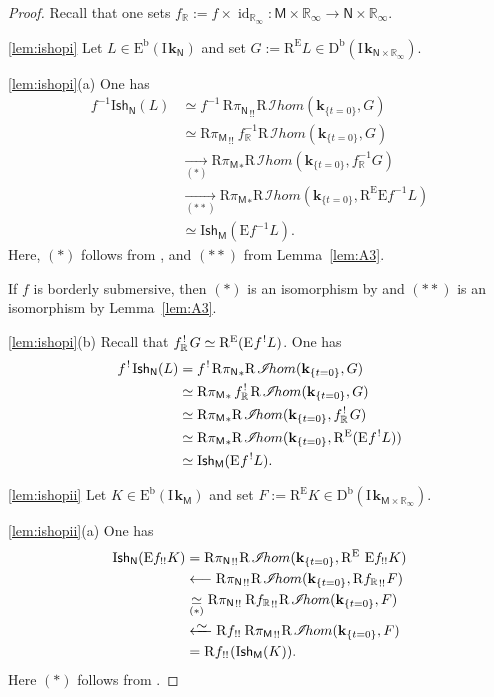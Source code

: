 \documentclass[11pt]{article}
\numberwithin{equation}{section}
\let\mathcal\mathscr
\newcommand\from{\mathchoice{\longleftarrow}{\leftarrow}{\leftarrow}{\leftarrow}}
\newcommand{\isofrom}[1][]{\xleftarrow[#1]%
{\raisebox{-.4ex}[0ex][-.4ex]{$\mspace{2mu}\sim\mspace{2mu}$}}}
\theoremstyle{plain}
\theoremstyle{definition}
\newcommand{\R}{\mathbb{R}}
\newcommand{\bR}{{\R_\infty}}
\newcommand{\derived}[1]{\mathrm{#1}}
\newcommand{\derd}{\derived{D}}
\newcommand{\dere}{\derived{E}}\let\enh\dere
\newcommand{\derr}{\derived{R}}
\newcommand{\BDC}{\derd^{\mathrm{b}}}
\newcommand{\BEC}[2][\ifield]{\dere^{\mathrm{b}}(#1_{#2})}
\newcommand{\roim}[1]{\derr#1_*}
\newcommand{\reeim}[1]{\derr#1_{\mspace{1mu}!!}\mspace{1mu}}
\newcommand{\rihom}{{\derr\mspace{2mu}\shi\!hom}}
\newcommand{\epb}[1]{#1^{\mspace{1.5mu}!}\mspace{2mu}}
\newcommand{\sheaffont}[1]{\mathcal{#1}}
\newcommand\shi{\sheaffont{I}}
\newcommand{\RE}{\operatorname{R^\enh}}
\newcommand{\Eopb}[1]{\enh#1^{-1}}
\newcommand{\Eeeim}[1]{\enh#1_{!!}}
\newcommand{\Eepb}[1]{\enh\mspace{1mu}#1^{\mspace{1.5mu}!}}
\DeclareMathOperator{\id}{id}
\newcommand{\field}{\mathbf{k}}\let\cor\field
\newcommand{\ind}{\mathrm{I}\mspace{2mu}}
\newcommand{\ifield}{\ind\field}
\newcommand{\Ish}{\mathrm{I}\mathsf{sh}}
\newcommand{\bbM}{\mathsf{M}}
\newcommand{\bbN}{\mathsf{N}}
\newcommand{\defeq}{\mathbin{:=}}\let \seteq\defeq
\newcommand{\st}[1]{{\{{#1}\}}}
\newcommand{\opb}[1]{#1^{-1}}
\begin{document}
\begin{proof}
Recall that one sets $f_\R \defeq f\times\id_\bR\colon \bbM\times\bR\to \bbN\times\bR$.

\eqref{lem:ishopi} Let $L\in\BEC\bbN$ and set $G\defeq\RE L\in\BDC(\ifield_{\bbN\times\bR})$.

\eqref{lem:ishopi}(a) One has
\begin{align*}
\opb f \Ish_{\bbN}(L)
&\simeq \opb f \,\reeim{{\pi_\bbN}} \rihom(\field_{\st{t=0}},G) \\
&\simeq\reeim{{\pi_\bbM}} \,\opb f_\R \rihom(\field_{\st{t=0}},G) \\
&\underset{(*)}\to \roim{{\pi_\bbM}} \rihom(\field_{\st{t=0}},\opb f_\R G) \\
&\underset{(**)}\to \roim{{\pi_\bbM}} \rihom(\field_{\st{t=0}},\RE\Eopb f L) \\
&\simeq \Ish_{\bbM}(\Eopb f L).
\end{align*}
Here, $(*)$ follows from \cite[Prop.\,3.3.13]{DK16},
and $(**)$ from Lemma~\ref{lem:A3}.

If $f$ is borderly submersive,
then $(*)$ is an isomorphism by \cite[Prop.\,3.3.19]{DK16}
and $(**)$ is an isomorphism by Lemma~\ref{lem:A3}.

\eqref{lem:ishopi}(b) Recall that $\epb{f_\R}G \simeq \RE(\Eepb f L)$. One has
\begin{align*}
\epb f \Ish_{\bbN}(L)
&= \epb f \roim{{\pi_\bbN}} \rihom(\field_{\st{t=0}},G) \\
&\simeq \roim{{\pi_\bbM}}\, \epb{f_\R} \rihom(\field_{\st{t=0}},G) \\
&\simeq \roim{{\pi_\bbM}} \rihom(\field_{\st{t=0}},\epb{f_\R} G) \\
&\simeq \roim{{\pi_\bbM}} \rihom(\field_{\st{t=0}},\RE(\Eepb f L)) \\
&\simeq \Ish_{\bbM} (\Eepb f L).
\end{align*}

\eqref{lem:ishopii}
Let $K\in\BEC\bbM$ and set $F\defeq\RE K\in\BDC(\ifield_{\bbM\times\bR})$.

\eqref{lem:ishopii}(a)
One has
\begin{align*}
\Ish_{\bbN}(\Eeeim f K)
&=\reeim{{\pi_\bbN}} \rihom(\field_{\st{t=0}}, \RE\,\Eeeim f K) \\
&\from \reeim{{\pi_\bbN}} \rihom(\field_{\st{t=0}}, \reeim{{f_\R}}F) \\
&\underset{(*)}\simeq \reeim{{\pi_\bbN}}\, \reeim{{f_\R}}\rihom(\field_{\st{t=0}}, F) \\
&\isofrom \reeim f\,\reeim{{\pi_\bbM}} \rihom(\field_{\st{t=0}}, F) \\
&= \reeim f (\Ish_{\bbM}(K)).
\end{align*}
Here $(*)$ follows from \cite[Lem.\,5.2.8]{KS01}.


\end{proof}
\end{document}
